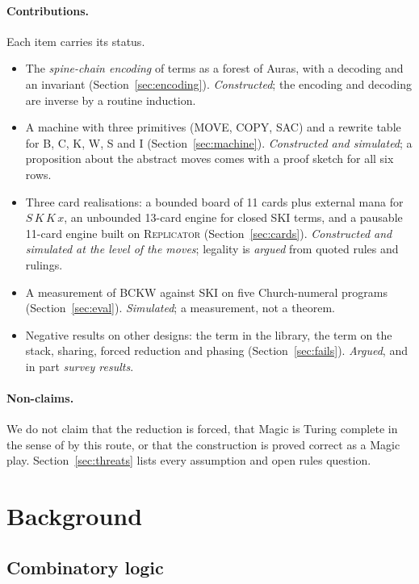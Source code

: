 \documentclass[11pt]{article}
\theoremstyle{definition}
\newcommand{\card}[1]{{\mdseries\scshape #1}}
\begin{document}
\paragraph{Contributions.} Each item carries its status.
\begin{itemize}[nosep,leftmargin=*]
\item The \emph{spine-chain encoding} of terms as a forest of Auras, with a decoding and
  an invariant (Section~\ref{sec:encoding}). \emph{Constructed}; the encoding and
  decoding are inverse by a routine induction.
\item A machine with three primitives (MOVE, COPY, SAC) and a rewrite table for B, C, K,
  W, S and I (Section~\ref{sec:machine}). \emph{Constructed and simulated}; a proposition
  about the abstract moves comes with a proof sketch for all six rows.
\item Three card realisations: a bounded board of 11 cards plus external mana for
  $S\,K\,K\,x$, an unbounded 13-card engine for closed SKI terms, and a pausable 11-card engine built on
  \card{Replicator} (Section~\ref{sec:cards}). \emph{Constructed and simulated at the level of
  the moves}; legality is \emph{argued} from quoted rules and rulings.
\item A measurement of BCKW against SKI on five Church-numeral programs
  (Section~\ref{sec:eval}). \emph{Simulated}; a measurement, not a theorem.
\item Negative results on other designs: the term in the library, the term on the stack,
  sharing, forced reduction and phasing (Section~\ref{sec:fails}). \emph{Argued}, and in
  part \emph{survey results}.
\end{itemize}

\paragraph{Non-claims.} We do not claim that the reduction is forced, that Magic is
Turing complete in the sense of \citet{cbh2019} by this route, or that the construction
is proved correct as a Magic play. Section~\ref{sec:threats} lists every assumption and
open rules question.

\section{Background}

\subsection{Combinatory logic}
\end{document}
